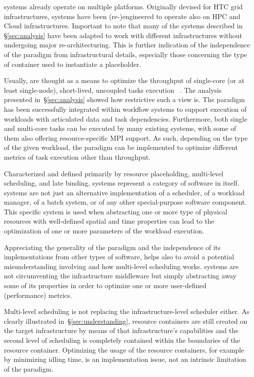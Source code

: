\documentclass{sig-alternate}
\begin{document}
\pilot systems already operate on multiple platforms. Originally devised for
HTC grid infrastructures, \pilot systems have been (re-)engineered to operate
also on HPC and Cloud infrastructures. Important to note that many of the
\pilot systems described in \S\ref{sec:analysis} have been adapted to work with
different infrastructures without undergoing major re-architecturing. This is
further indication of the independence of the \pilot paradigm from
infrastructural details, especially those concerning the type of container used
to instantiate a placeholder.

Usually, \pilots are thought as a means to optimize the throughput of
single-core (or at least single-node), short-lived, uncoupled tasks execution
~\cite{pordes2007,sfiligoi2009,juve2010}. The analysis presented
in~\S\ref{sec:analysis} showed how restrictive such a view is. The \pilot
paradigm has been successfully integrated within workflow systems to support
execution of workloads with articulated data and task dependencies.
Furthermore, both single and multi-core tasks can be executed by many existing
\pilot systems, with some of them also offering resource-specific MPI support.
As such, depending on the type of the given workload, the \pilot paradigm can be
implemented to optimize different metrics of task execution other than
throughput.

Characterized and defined primarily by resource placeholding, multi-level
scheduling, and late binding, \pilot systems represent a category of software in
itself. \pilot systems are not just an alternative implementation of a
scheduler, of a workload manager, of a batch system, or of any other
special-purpose software component. This specific system is used when
abstracting one or more type of physical resources with well-defined spatial and
time properties can lead to the optimization of one or more parameters of the
workload execution.

Appreciating the generality of the \pilot paradigm and the independence of its
implementations from other types of software, helps also to avoid a potential
misunderstanding involving \pilots and how multi-level scheduling works. \pilot
systems are not circumventing the infrastructure middleware but simply
abstracting away some of its properties in order to optimize one or more
user-defined (performance) metrics.

Multi-level scheduling is not replacing the infrastructure-level scheduler
either. As clearly illustrated in~\S\ref{sec:understanding}, resource
containers are still created on the target infrastructure by means of that
infrastructure's capabilities and the second level of scheduling is completely
contained within the boundaries of the resource container. Optimizing the usage
of the resource containers, for example by minimizing idling time, is an
implementation issue, not an intrinsic limitation of the \pilot paradigm.
\end{document}
